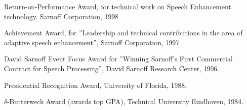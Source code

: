 
\begin{items}
\item Return-on-Performance Award, for technical work on
Speech Enhancement technology, Sarnoff Corporation, 1998
\item Achievement Award, for ''Leadership and technical contributions in
the area of adaptive speech enhancement'', Sarnoff Corporation, 1997
\item David Sarnoff Event Focus Award for ''Winning Sarnoff's First Commercial Contract for Speech Processing'', David Sarnoff Research Center, 1996.
\item Presidential Recognition Award, University of Florida, 1988.
\item $\delta$-Butterweck Award (awards top GPA), Technical University
Eindhoven, 1984.
\end{items}

